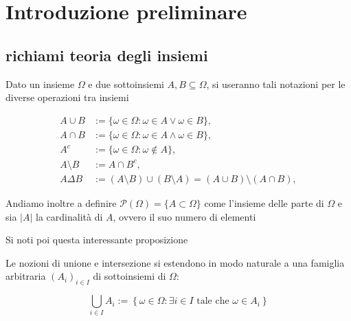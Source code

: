 \chapter{Introduzione preliminare}
\section{richiami teoria degli insiemi}
Dato un insieme $\Omega$ e due sottoinsiemi $A,B\subseteq  \Omega$, si useranno tali notazioni per le diverse operazioni tra insiemi

\[
    \begin{aligned}
        A \cup B &:= \{\omega \in \Omega : \omega \in A \lor \omega \in B\}, \\
        A \cap B &:= \{\omega \in \Omega : \omega \in A \land \omega \in B\}, \\
        A^c &:= \{\omega \in \Omega : \omega \notin A\}, \\
        A \setminus B &:= A \cap B^c, \\
        A \Delta B &:= (A \setminus B) \cup (B \setminus A) = (A \cup B) \setminus (A \cap B),
    \end{aligned}
\]

Andiamo inoltre a definire $\mathcal{P}(\Omega) = \{A\subset\Omega\}$ come l'insieme delle parte di $\Omega$ e sia $|A|$ la cardinalità di $A$, ovvero il suo numero di elementi

Si noti poi questa interessante proposizione

Le nozioni di unione e intersezione si estendono in modo naturale a una famiglia arbitraria $(A_i)_{i \in I}$ di sottoinsiemi di $\Omega$:

    \[
        \bigcup_{i \in I} A_i := \left\{\omega \in \Omega : \exists i \in I \text{ tale che } \omega \in A_i\right\}
    \]

